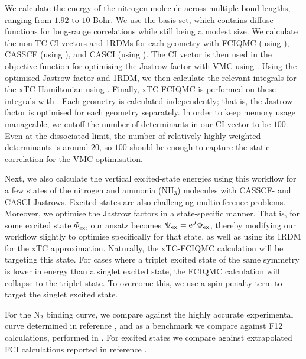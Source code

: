 We calculate the energy of the nitrogen molecule across multiple bond lengths, ranging from $1.92$ to $10$ Bohr. We use the \avtz basis set, which contains diffuse functions for long-range correlations while still being a modest size. We calculate the non-TC CI vectors and \glspl{1RDM} for each geometry with FCIQMC (using \neci),\supercite{gutherNECI2020} CASSCF (using \molpro),\supercite{wernerMOLPRO,wernerMolpro2012,wernerMolproQuantumChemistry2020} and CASCI (using \pyscf).\supercite{sunPySCF2018} The CI vector is then used in the objective function for optimising the Jastrow factor with VMC using \casino.\supercite{needsVariational2020} Using the optimised Jastrow factor and 1RDM, we then calculate the relevant integrals for the xTC Hamiltonian using \pytchint. Finally, xTC-FCIQMC is performed on these integrals with \neci. Each geometry is calculated independently; that is, the Jastrow factor is optimised for each geometry separately. In order to keep memory usage manageable, we cutoff the number of determinants in our CI vector to be $100$. Even at the dissociated limit, the number of relatively-highly-weighted determinants is around $20$, so $100$ should be enough to capture the static correlation for the VMC optimisation.

Next, we also calculate the vertical excited-state energies using this workflow for a few states of the nitrogen and ammonia (NH$_3$) molecules with CASSCF- and CASCI-Jastrows. Excited states are also challenging multireference problems. Moreover, we optimise the Jastrow factors in a state-specific manner. That is, for some excited state $\Phi_\mathrm{ex}$, our ansatz becomes $\Psi_\mathrm{ex} = \mathrm{e}^J\Phi_\mathrm{ex}$, thereby modifying our workflow slightly to optimise specifically for that state, as well as using its 1RDM for the xTC approximation. Naturally, the xTC-FCIQMC calculation will be targeting this state. For cases where a triplet excited state of the same symmetry is lower in energy than a singlet excited state, the FCIQMC calculation will collapse to the triplet state. To overcome this, we use a spin-penalty term to target the singlet excited state.\supercite{weserSpin2022}

For the N$_2$ binding curve, we compare against the highly accurate experimental curve determined in reference , and as a benchmark we compare against F12 calculations, performed in \molpro. For excited states we compare against extrapolated FCI calculations reported in reference .

